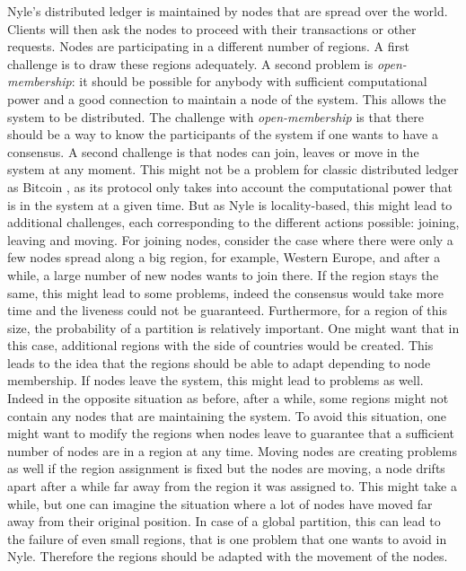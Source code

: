 \documentclass[a4paper,11pt,oneside]{report}
\begin{document}
Nyle's distributed ledger is maintained by nodes that are spread over the
world.  Clients will then ask the nodes to proceed with their transactions or
other requests. Nodes are participating in a different number of regions. A
first challenge is to draw these regions adequately. A second problem is
\textit{open-membership}: it should be possible for anybody with sufficient
computational power and a good connection to maintain a node of the system.
This allows the system to be distributed. The challenge with
\textit{open-membership} is that there should be a way to know the participants
of the system if one wants to have a consensus.  A second challenge is that
nodes can join, leaves or move in the system at any moment. This might not be a
problem for classic distributed ledger as Bitcoin \cite{Nakamoto2009}, as its
protocol only takes into account the computational power that is in the system
at a given time. But as Nyle is locality-based, this might lead to additional
challenges, each corresponding to the different actions possible: joining,
leaving and moving. For joining nodes, consider the case where there were only
a few nodes spread along a big region, for example, Western Europe, and after a
while, a large number of new nodes wants to join there. If the region stays the
same, this might lead to some problems, indeed the consensus would take more
time and the liveness could not be guaranteed. Furthermore, for a region of
this size, the probability of a partition is relatively important.  One might
want that in this case, additional regions with the side of countries would be
created. This leads to the idea that the regions should be able to adapt
depending to node membership. If nodes leave the system, this might lead to
problems as well. Indeed in the opposite situation as before, after a while,
some regions might not contain any nodes that are maintaining the system. To
avoid this situation, one might want to modify the regions when nodes leave to
guarantee that a sufficient number of nodes are in a region at any time. Moving
nodes are creating problems as well if the region assignment is fixed but the
nodes are moving, a node drifts apart after a while far away from the region it
was assigned to. This might take a while, but one can imagine the situation
where a lot of nodes have moved far away from their original position. In case
of a global partition, this can lead to the failure of even small regions, that
is one problem that one wants to avoid in Nyle. Therefore the regions should be
adapted with the movement of the nodes. 
\end{document}

